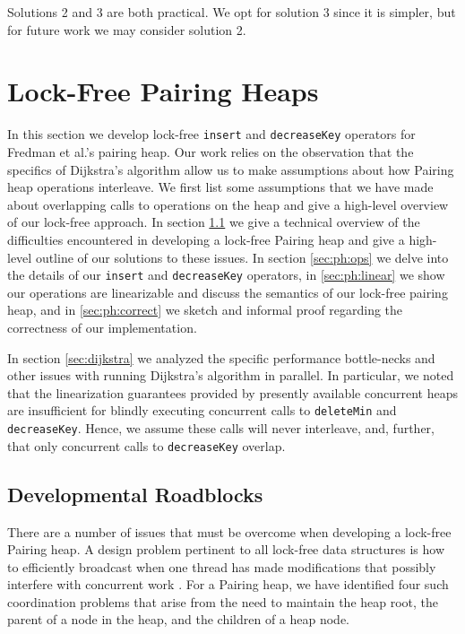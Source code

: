 \documentclass{acm_proc_article-sp}
\begin{document}
Solutions 2 and 3 are both practical. We opt for solution 3 since it is simpler, but
for future work we may consider solution 2.

\section{Lock-Free Pairing Heaps}
In this section we develop lock-free \texttt{insert} and \texttt{decreaseKey}
operators for Fredman et al.'s pairing heap. Our
work relies on the observation that
the specifics of
Dijkstra's algorithm allow us to make assumptions about how
Pairing heap operations interleave. 
We first list some assumptions that we have made about overlapping
calls to operations on the heap and give a high-level overview
of our lock-free approach. In section \ref{sec:ph:roadblocks}
we give a technical overview of the difficulties encountered
in developing a lock-free Pairing heap and give a high-level
outline of our solutions to these issues.
In section \ref{sec:ph:ops} we delve into the details of our
\texttt{insert} and \texttt{decreaseKey} operators, in \ref{sec:ph:linear} we show
our operations are linearizable and discuss the semantics
of our lock-free pairing heap, and in \ref{sec:ph:correct} we sketch and informal proof
regarding the correctness
of our implementation.

In section \ref{sec:dijkstra} we analyzed the specific performance bottle-necks and other
issues with running Dijkstra's algorithm in parallel. In particular, we noted that the
linearization guarantees provided by presently available concurrent heaps are insufficient for
blindly executing
concurrent calls to \texttt{deleteMin} and \texttt{decreaseKey}. Hence, we assume
these calls will never interleave, and, further, that only concurrent calls to 
\texttt{decreaseKey} overlap.

\subsection{Developmental Roadblocks}
\label{sec:ph:roadblocks}

There are a number of issues that must be overcome when developing
a lock-free Pairing heap. A design problem pertinent to all lock-free data
structures is how to efficiently broadcast when one thread has made modifications
that possibly interfere with concurrent work \cite{herlihy91}. 
For a Pairing heap, we have identified
four such coordination problems that arise from the need to
maintain the heap root, the parent of a node in the heap, and
the children of a heap node.
\end{document}
